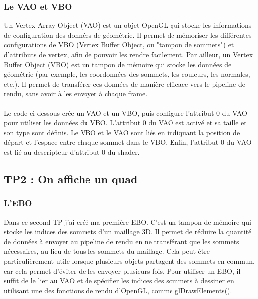 \documentclass[10pt,a4paper]{article}
\begin{document}
		\subsubsection{Le VAO et VBO} %
			Un Vertex Array Object (VAO) est un objet OpenGL qui stocke les informations de configuration des données de géométrie. Il permet de mémoriser les différentes configurations de VBO (Vertex Buffer Object, ou "tampon de sommets") et d'attributs de vertex, afin de pouvoir les rendre facilement. Par ailleur, un Vertex Buffer Object (VBO) est un tampon de mémoire qui stocke les données de géométrie (par exemple, les coordonnées des sommets, les couleurs, les normales, etc.). Il permet de transférer ces données de manière efficace vers le pipeline de rendu, sans avoir à les envoyer à chaque frame.

			\paragraph{}Le code ci-dessous crée un VAO et un VBO, puis configure l'attribut 0 du VAO pour utiliser les données du VBO. L'attribut 0 du VAO est activé et sa taille et son type sont définis. Le VBO et le VAO sont liés en indiquant la position de départ et l'espace entre chaque sommet dans le VBO. Enfin, l'attribut 0 du VAO est lié au descripteur d'attribut 0 du shader.

			
			

	\subsection{TP2 : On affiche un quad} %

		\subsubsection{L'EBO} %
			Dans ce second TP j'ai créé ma première EBO. C'est un tampon de mémoire qui stocke les indices des sommets d'un maillage 3D. Il permet de réduire la quantité de données à envoyer au pipeline de rendu en ne transférant que les sommets nécessaires, au lieu de tous les sommets du maillage. Cela peut être particulièrement utile lorsque plusieurs objets partagent des sommets en commun, car cela permet d'éviter de les envoyer plusieurs fois. Pour utiliser un EBO, il suffit de le lier au VAO et de spécifier les indices des sommets à dessiner en utilisant une des fonctions de rendu d'OpenGL, comme glDrawElements().
			
\end{document}
